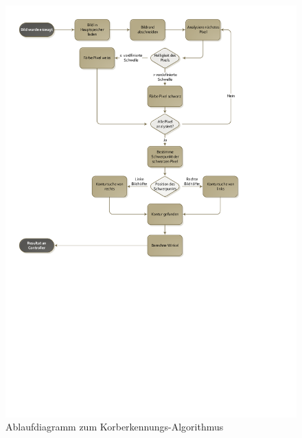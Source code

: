 		\begin{figure}[h!]
			\centering
			\includegraphics[width=1\textwidth,clip,trim=9mm 115mm 41mm 9mm]
			{Enddokumentation/Loesungskonzept/Bilder/Flowchart_Korberkennung.pdf}
			\caption{Ablaufdiagramm zum Korberkennungs-Algorithmus}
			\label{fig:KorberkennungFlowchart}
		\end{figure}